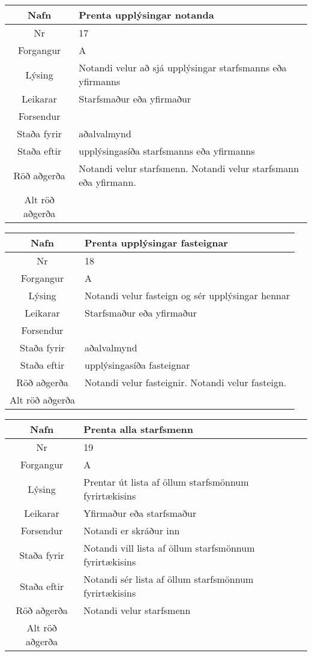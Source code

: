 \caption{Use case 16}\label{tab:use_case_16}
\begin{table}[h!]\centering
\begin{tabular}{|c|p{10cm}|}
\hline
Nafn&Prenta upplýsingar notanda\\
\hline
Nr&17\\
\hline
Forgangur&A\\
\hline
Lýsing&Notandi velur að sjá upplýsingar starfsmanns eða yfirmanns\\
\hline
Leikarar&Starfsmaður eða yfirmaður\\
\hline
Forsendur&\\
\hline
Staða fyrir&aðalvalmynd\\
\hline
Staða eftir&upplýsingasíða starfsmanns eða yfirmanns\\
\hline
Röð aðgerða&Notandi velur starfsmenn. Notandi velur starfsmann eða yfirmann.\\
\hline
Alt röð aðgerða&\\
\hline
\end{tabular}
\end{table}
\caption{Use case 17}\label{tab:use_case_17}
\begin{table}[h!]\centering
\begin{tabular}{|c|p{10cm}|}
\hline
Nafn&Prenta upplýsingar fasteignar\\
\hline
Nr&18\\
\hline
Forgangur&A\\
\hline
Lýsing&Notandi velur fasteign og sér upplýsingar hennar\\
\hline
Leikarar&Starfsmaður eða yfirmaður\\
\hline
Forsendur&\\
\hline
Staða fyrir&aðalvalmynd\\
\hline
Staða eftir&upplýsingasíða fasteignar\\
\hline
Röð aðgerða&Notandi velur fasteignir. Notandi velur fasteign.\\
\hline
Alt röð aðgerða&\\
\hline
\end{tabular}
\end{table}
\caption{Use case 18}\label{tab:use_case_18}
\begin{table}[h!]\centering
\begin{tabular}{|c|p{10cm}|}
\hline
Nafn&Prenta alla starfsmenn\\
\hline
Nr&19\\
\hline
Forgangur&A\\
\hline
Lýsing&Prentar út lista af öllum starfsmönnum fyrirtækisins\\
\hline
Leikarar&Yfirmaður eða starfsmaður\\
\hline
Forsendur&Notandi er skráður inn\\
\hline
Staða fyrir&Notandi vill lista af öllum starfsmönnum fyrirtækisins\\
\hline
Staða eftir&Notandi sér lista af öllum starfsmönnum fyrirtækisins\\
\hline
Röð aðgerða&Notandi velur starfsmenn\\
\hline
Alt röð aðgerða&\\
\hline
\end{tabular}
\end{table}
